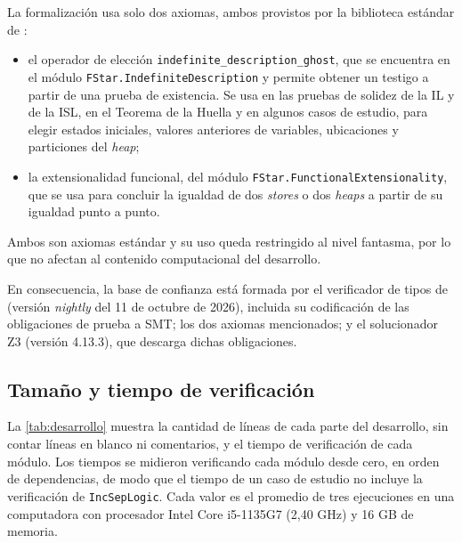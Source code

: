 \documentclass[a4paper,	11pt]{report}
\begin{document}
La formalización usa solo dos axiomas,
ambos provistos por la biblioteca estándar de \fstar{}:
\begin{itemize}
  \item el operador de elección \lstinline|indefinite_description_ghost|,
  que se encuentra en el módulo \lstinline|FStar.IndefiniteDescription| y permite obtener un testigo a partir de una prueba de existencia.
  Se usa en las pruebas de solidez de la IL y de la ISL,
  en el Teorema de la Huella y en algunos casos de estudio,
  para elegir estados iniciales,
  valores anteriores de variables, ubicaciones y particiones del \emph{heap};
  \item la extensionalidad funcional,
  del módulo \lstinline|FStar.FunctionalExtensionality|,
  que se usa para concluir la igualdad de dos \emph{stores} o dos \emph{heaps} a partir de su igualdad punto a punto.
\end{itemize}
Ambos son axiomas estándar y su uso queda restringido al nivel fantasma,
por lo que no afectan al contenido computacional del desarrollo.

En consecuencia,
la base de confianza está formada por el verificador de tipos de \fstar{} (versión \emph{nightly} del 11 de octubre de 2026),
incluida su codificación de las obligaciones de prueba a SMT;
los dos axiomas mencionados;
y el solucionador Z3 (versión 4.13.3),
que descarga dichas obligaciones.

\subsection*{Tamaño y tiempo de verificación}
La \autoref{tab:desarrollo} muestra la cantidad de líneas de cada parte del desarrollo,
sin contar líneas en blanco ni comentarios,
y el tiempo de verificación de cada módulo.
Los tiempos se midieron verificando cada módulo desde cero,
en orden de dependencias,
de modo que el tiempo de un caso de estudio no incluye la verificación de \lstinline|IncSepLogic|.
Cada valor es el promedio de tres ejecuciones en una computadora con procesador Intel Core i5-1135G7 (2,40 GHz) y 16 GB de memoria.
\end{document}
